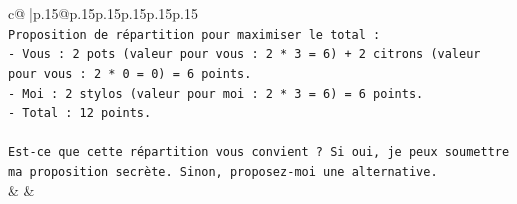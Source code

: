 \documentclass{article}
\begin{document}
{\begin{supertabular}{c@{$\;$}|p{.15\linewidth}@{}p{.15\linewidth}p{.15\linewidth}p{.15\linewidth}p{.15\linewidth}p{.15\linewidth}}
{{{\\ 
\texttt{Proposition de répartition pour maximiser le total :} \\
\texttt{{-} Vous : 2 pots (valeur pour vous : 2 * 3 = 6) + 2 citrons (valeur pour vous : 2 * 0 = 0) = 6 points.} \\
\texttt{{-} Moi : 2 stylos (valeur pour moi : 2 * 3 = 6) = 6 points.} \\
\texttt{{-} Total : 12 points.} \\
\\ 
\texttt{Est{-}ce que cette répartition vous convient ? Si oui, je peux soumettre ma proposition secrète. Sinon, proposez{-}moi une alternative.} \\
            }
        }
    }
    & & \\ \\


\end{supertabular}}
\end{document}
